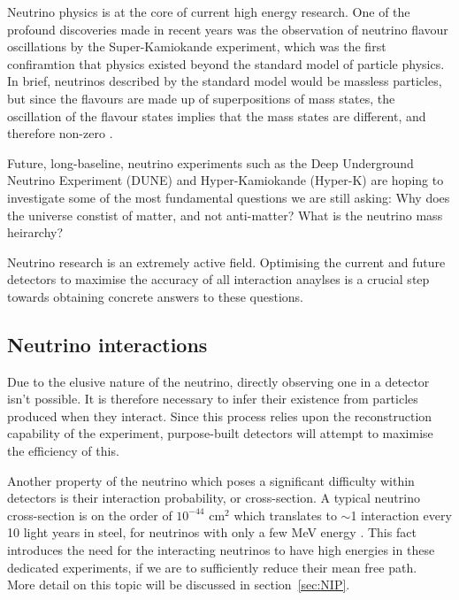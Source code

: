 

Neutrino physics is at the core of current high energy research. One of the profound discoveries made in recent years was the observation of neutrino flavour oscillations by the Super-Kamiokande experiment, which was the first confiramtion that physics existed beyond the standard model of particle physics. In brief, neutrinos described by the standard model would be massless particles, but since the flavours are made up of superpositions of mass states, the oscillation of
the flavour states implies that the mass states are different, and therefore non-zero \cite{nuInt}.

    Future, long-baseline,  neutrino experiments such as the Deep Underground Neutrino Experiment (DUNE) and Hyper-Kamiokande (Hyper-K) are hoping to investigate some of the most fundamental questions we are still asking: Why does the universe constist of matter, and not anti-matter? What is the neutrino mass heirarchy?

    Neutrino research is an extremely active field. Optimising the current and future detectors to maximise the accuracy of all interaction anaylses is a crucial step towards obtaining concrete answers to these questions.

\subsection{Neutrino interactions}

Due to the elusive nature of the neutrino, directly observing one in a detector isn't possible. It is therefore necessary to infer their existence from particles produced when they interact. Since this process relies upon the reconstruction capability of the experiment, purpose-built detectors will attempt to maximise the efficiency of this.

Another property of the neutrino which poses a significant difficulty within detectors is their interaction probability, or cross-section. A typical neutrino cross-section is on the order of $ 10^{-44} $ cm$^{2}$ which translates to $\sim$1 interaction every 10 light years in steel, for neutrinos with only a few MeV energy \cite{nuOsc}. This fact introduces the need for the interacting neutrinos to have high energies in these dedicated experiments, if we are to sufficiently reduce their mean free path. \\  

More detail on this topic will be discussed in section~\ref{sec:NIP}.


